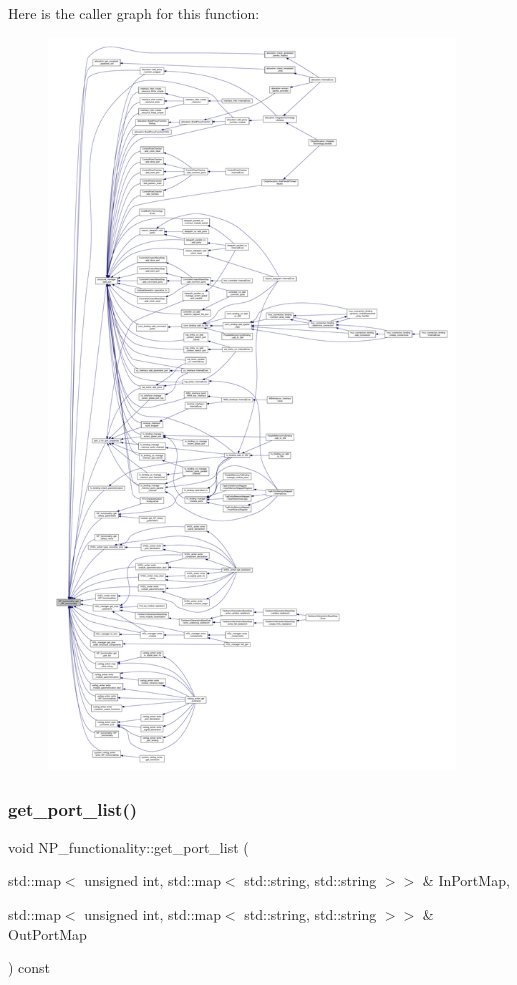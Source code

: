 Here is the caller graph for this function\+:
\nopagebreak
\begin{figure}[H]
\begin{center}
\leavevmode
\includegraphics[height=550pt]{d8/dda/classNP__functionality_aabcd7ea1bf14f96b7eeacf7251a68365_icgraph}
\end{center}
\end{figure}
\mbox{\label{classNP__functionality_a10fa42ec58e4687fa2b31e965dae3f29}} 
\subsubsection{\texorpdfstring{get\+\_\+port\+\_\+list()}{get\_port\_list()}}
{\footnotesize\ttfamily void N\+P\+\_\+functionality\+::get\+\_\+port\+\_\+list (\begin{DoxyParamCaption}\item[{std\+::map$<$ unsigned int, std\+::map$<$ std\+::string, std\+::string $>$$>$ \&}]{In\+Port\+Map,  }\item[{std\+::map$<$ unsigned int, std\+::map$<$ std\+::string, std\+::string $>$$>$ \&}]{Out\+Port\+Map }\end{DoxyParamCaption}) const}



